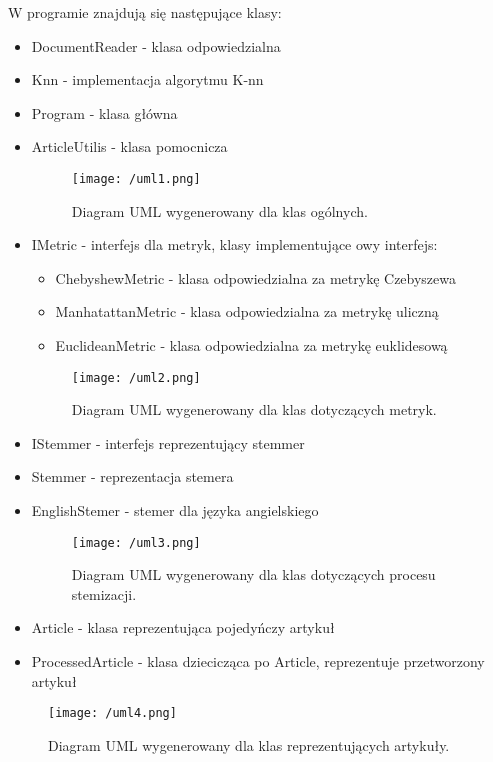 \documentclass{classrep}
\begin{document}
W programie znajdują się następujące klasy:
\begin{itemize}[label=$\bullet$]
\item DocumentReader - klasa odpowiedzialna
\item Knn - implementacja algorytmu K-nn
\item Program - klasa główna
\item ArticleUtilis - klasa pomocnicza

\begin{figure}[H]
	\centering
	\texttt{[image: /uml1.png]}
	\caption{Diagram UML wygenerowany dla klas ogólnych.}
\end{figure}

\item IMetric - interfejs dla metryk, klasy implementujące owy interfejs:
\begin{itemize}
\item ChebyshewMetric -  klasa odpowiedzialna za metrykę Czebyszewa
\item ManhatattanMetric -  klasa odpowiedzialna za metrykę uliczną
\item EuclideanMetric - klasa odpowiedzialna za metrykę euklidesową\\
\end{itemize}

\begin{figure}[H]
	\centering
	\texttt{[image: /uml2.png]}
	\caption{Diagram UML wygenerowany dla klas dotyczących metryk. }
\end{figure}

\item IStemmer - interfejs reprezentujący stemmer
\item Stemmer - reprezentacja stemera
\item EnglishStemer - stemer dla języka angielskiego

\begin{figure}[H]
	\centering
	\texttt{[image: /uml3.png]}
	\caption{Diagram UML wygenerowany dla klas dotyczących procesu stemizacji.}
\end{figure}

\item Article - klasa reprezentująca pojedyńczy artykuł
\item ProcessedArticle - klasa dziecicząca po Article, reprezentuje przetworzony artykuł
\end{itemize}

\begin{figure}[H]
	\centering
	\texttt{[image: /uml4.png]}
	\caption{Diagram UML wygenerowany dla klas reprezentujących artykuły.}
\end{figure}
\end{document}
